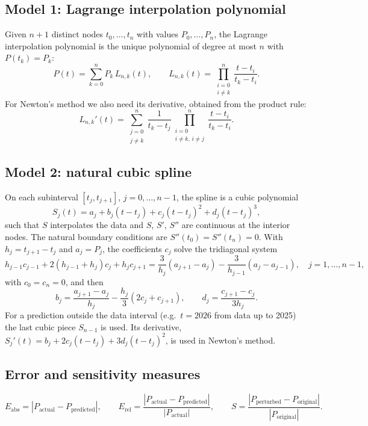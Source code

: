 \documentclass[11pt,a4paper]{article}
\begin{document}
\subsection{Model 1: Lagrange interpolation polynomial}
Given $n+1$ distinct nodes $t_0,\dots,t_n$ with values $P_0,\dots,P_n$, the Lagrange
interpolation polynomial is the unique polynomial of degree at most $n$ with
$P(t_k)=P_k$:
\begin{equation}
P(t) = \sum_{k=0}^{n} P_k\, L_{n,k}(t), \qquad
L_{n,k}(t) = \prod_{\substack{i=0\\ i\neq k}}^{n} \frac{t-t_i}{t_k-t_i}.
\label{eq:lagrange}
\end{equation}
For Newton's method we also need its derivative, obtained from the product rule:
\begin{equation}
L_{n,k}'(t) = \sum_{\substack{j=0\\ j\neq k}}^{n} \frac{1}{t_k-t_j}
\prod_{\substack{i=0\\ i\neq k,\, i\neq j}}^{n} \frac{t-t_i}{t_k-t_i}.
\end{equation}

\subsection{Model 2: natural cubic spline}
On each subinterval $[t_j,t_{j+1}]$, $j=0,\dots,n-1$, the spline is a cubic polynomial
\begin{equation}
S_j(t) = a_j + b_j(t-t_j) + c_j(t-t_j)^2 + d_j(t-t_j)^3,
\end{equation}
such that $S$ interpolates the data and $S$, $S'$, $S''$ are continuous at the
interior nodes. The natural boundary conditions are $S''(t_0)=S''(t_n)=0$.
With $h_j = t_{j+1}-t_j$ and $a_j = P_j$, the coefficients $c_j$ solve the
tridiagonal system
\begin{equation}
h_{j-1}c_{j-1} + 2(h_{j-1}+h_j)c_j + h_j c_{j+1}
= \frac{3}{h_j}(a_{j+1}-a_j) - \frac{3}{h_{j-1}}(a_j-a_{j-1}),
\quad j=1,\dots,n-1,
\end{equation}
with $c_0=c_n=0$, and then
\begin{equation}
b_j = \frac{a_{j+1}-a_j}{h_j} - \frac{h_j}{3}(2c_j+c_{j+1}), \qquad
d_j = \frac{c_{j+1}-c_j}{3h_j}.
\end{equation}
For a prediction outside the data interval (e.g.\ $t=2026$ from data up to 2025)
the last cubic piece $S_{n-1}$ is used. Its derivative,
$S_j'(t) = b_j + 2c_j(t-t_j) + 3d_j(t-t_j)^2$, is used in Newton's method.

\subsection{Error and sensitivity measures}
\begin{equation}
E_{\text{abs}} = |P_{\text{actual}} - P_{\text{predicted}}|, \qquad
E_{\text{rel}} = \frac{|P_{\text{actual}} - P_{\text{predicted}}|}{|P_{\text{actual}}|}, \qquad
S = \frac{|P_{\text{perturbed}} - P_{\text{original}}|}{|P_{\text{original}}|}.
\end{equation}
\end{document}
